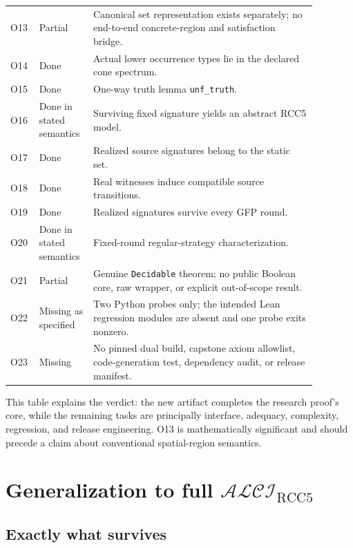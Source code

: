 \documentclass[11pt]{article}
\newcommand{\code}[1]{\texttt{#1}}
\begin{document}
\begin{longtable}{>{\raggedright\arraybackslash}p{0.07\linewidth}
                  >{\raggedright\arraybackslash}p{0.14\linewidth}
                  >{\raggedright\arraybackslash}p{0.67\linewidth}}
O13 & Partial & Canonical set representation exists separately; no end-to-end
concrete-region and satisfaction bridge. \\
O14 & Done & Actual lower occurrence types lie in the declared cone spectrum. \\
O15 & Done & One-way truth lemma \code{unf\_truth}. \\
O16 & Done in stated semantics & Surviving fixed signature yields an abstract RCC5
model. \\
O17 & Done & Realized source signatures belong to the static set. \\
O18 & Done & Real witnesses induce compatible source transitions. \\
O19 & Done & Realized signatures survive every GFP round. \\
O20 & Done in stated semantics & Fixed-round regular-strategy characterization. \\
O21 & Partial & Genuine \code{Decidable} theorem; no public Boolean core, raw wrapper,
or explicit out-of-scope result. \\
O22 & Missing as specified & Two Python probes only; the intended Lean regression
modules are absent and one probe exits nonzero. \\
O23 & Missing & No pinned dual build, capstone axiom allowlist, code-generation test,
dependency audit, or release manifest. \\
\bottomrule
\end{longtable}

This table explains the verdict: the new artifact completes the research proof's core,
while the remaining tasks are principally interface, adequacy, complexity, regression,
and release engineering. O13 is mathematically significant and should precede a claim
about conventional spatial-region semantics.

\section{Generalization to full $\mathcal{ALCI}_{\mathrm{RCC5}}$}

\subsection{Exactly what survives}
\end{document}
